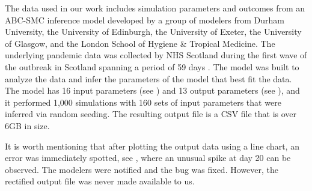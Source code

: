 The data used in our work includes simulation parameters and outcomes from an \ac{ABC-SMC} inference model \cite{toni2008Approximate} developed by a group of modelers from Durham University, the University of Edinburgh, the University of Exeter, the University of Glasgow, and the London School of Hygiene \& Tropical Medicine.
The underlying pandemic data was collected by NHS Scotland during the first wave of the outbreak in Scotland spanning a period of 59 days \cite{2020Covid19}.
The model was built to analyze the data and infer the parameters of the model that best fit the data.
The model has 16 input parameters (see ) and 13 output parameters (see ), and it performed 1,000 simulations with 160 sets of input parameters that were inferred via random seeding.
The resulting output file is a CSV file that is over 6GB in size.

It is worth mentioning that after plotting the output data using a line chart, an error was immediately spotted, see , where an unusual spike at day 20 can be observed.
The modelers were notified and the bug was fixed.
However, the rectified output file was never made available to us.

